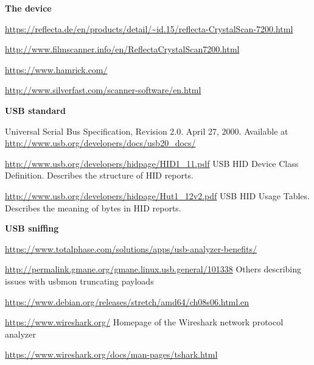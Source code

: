 \documentclass{article}
\begin{document}
\renewcommand{\refname}{Links}
\begin{thebibliography}{}
  \setcounter{enumiv}{\value{firstbib}}
  \item[]\hspace{-\labelwidth}\hspace{-\labelsep}\textbf{The device}
  
  \url{https://reflecta.de/en/products/detail/~id.15/reflecta-CrystalScan-7200.html}
  
  \url{http://www.filmscanner.info/en/ReflectaCrystalScan7200.html}
  
  \url{https://www.hamrick.com/}
  
  \url{http://www.silverfast.com/scanner-software/en.html}
  
  \item[]\hspace{-\labelwidth}\hspace{-\labelsep}\textbf{USB standard}
  
   Universal Serial Bus Specification, Revision 2.0.
                   April 27, 2000. Available at
                   \url{http://www.usb.org/developers/docs/usb20_docs/}

  \url{http://www.usb.org/developers/hidpage/HID1_11.pdf}
  USB HID Device Class Definition. Describes the structure of HID reports.
  
  \url{http://www.usb.org/developers/hidpage/Hut1_12v2.pdf}
  USB HID Usage Tables. Describes the meaning of bytes in HID reports.

  \item[]\hspace{-\labelwidth}\hspace{-\labelsep}\textbf{USB sniffing}


  \url{https://www.totalphase.com/solutions/apps/usb-analyzer-benefits/}

  \url{http://permalink.gmane.org/gmane.linux.usb.general/101338}
  Others describing issues with {\it} usbmon truncating payloads
  
  \url{https://www.debian.org/releases/stretch/amd64/ch08s06.html.en}

  \url{https://www.wireshark.org/}
  Homepage of the Wireshark network protocol analyzer
  
  \url{https://www.wireshark.org/docs/man-pages/tshark.html}
  

\end{thebibliography}
\end{document}

